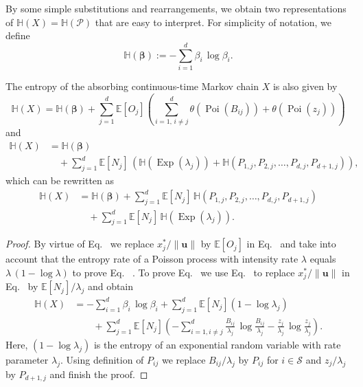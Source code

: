 \documentclass[smallextended]{svjour3}
\makeatletter
\renewcommand*{\eqref}[1]{%
  \hyperref[{#1}]{\textup{\tagform@{\ref*{#1}}}}%
}
\renewcommand{\vec}[1]{\mathbf{#1}}
\newcommand{\E}{\mathbb{E}}
\renewcommand{\H}{\mathbb{H}}
\newcommand{\Exp}{\operatorname{Exp}}
\newcommand{\Poi}{\operatorname{Poi}}
\newcommand{\suml}{\sum\limits}
\newcommand{\vnorms}[1]{\|#1\|}
\makeatother
\begin{document}
By some simple substitutions and rearrangements, we obtain two representations of $\H(X)=\H(\mathcal{P})$ that are easy to interpret.
For simplicity of notation, we define
\begin{equation}
  \H(\vec{\beta}) := -\suml_{i=1}^d\beta_i\,\log\beta_i.
\end{equation}

\begin{myproposition}\label{prop:entropy_of_X}
	The entropy of the absorbing continuous-time Markov chain $X$ is also given by
	\begin{equation}
	  \label{eqn:H_occupation_time}
	  \H(X) = \H(\vec{\beta}) + \suml_{j=1}^d \E\left[O_j\right] \left(\suml_{i=1,\,i\neq j}^d \theta(\Poi(B_{ij})) + \theta(\Poi(z_j))\right)
	\end{equation}
	and
	\begin{equation}
	  \label{eqn:H_number_of_visits}
	  \begin{aligned}
      \H(X)& = \H(\vec{\beta})\\
      &\quad + \suml_{j=1}^d \E\left[N_j\right]\, \left(\H(\Exp(\lambda_j)) + \H(P_{1,j}, P_{2, j},\ldots,P_{d, j}, P_{d+1,j})\right),
    \end{aligned}
  \end{equation}
  which can be rewritten as
  \begin{align}
    \H(X) & = \H(\vec{\beta}) + \suml_{j=1}^d \E\left[N_j\right]\, \H(P_{1,j}, P_{2, j},\ldots,P_{d, j}, P_{d+1,j}) \label{eqn:H_discrete} \\
    &\quad + \suml_{j=1}^d \E\left[N_j\right]\, \H(\Exp(\lambda_j)).\label{eqn:H_continuous}      
  \end{align}
\end{myproposition}

\begin{proof}
  By virtue of Eq.~\eqref{eqn:H_occupation_time} we replace $x^\ast_j/\vnorms{\vec{u}}$ by $\E\left[O_j\right]$ in Eq.~\eqref{eqn:H_X} and take into account that the entropy rate of a Poisson process with intensity rate $\lambda$ equals $\lambda\,(1-\log \lambda)$ to prove Eq.~\eqref{eqn:H_occupation_time}.
  To prove Eq.~\eqref{eqn:H_number_of_visits} we use Eq.~\eqref{eqn:N_i} to replace $x^\ast_j/\vnorms{\vec{u}}$ in Eq.~\eqref{eqn:H_X} by $\E\left[N_j\right]/\lambda_j$ and obtain
  \begin{equation}
    \begin{aligned}
      \H(X) &= -\suml_{i=1}^d\beta_i\,\log\beta_i + \suml_{j=1}^d \E\left[N_j\right](1-\log \lambda_j)\\
      &\qquad +\suml_{j=1}^d \E\left[N_j\right]\left(- \suml_{i=1,i\neq j}^d \frac{B_{ij}}{\lambda_j}\,\log \frac{B_{ij}}{\lambda_j} - \frac{z_j}{\lambda_j}\,\log \frac{z_j}{\lambda_j}\right).
    \end{aligned}
	\end{equation}
	Here, $(1-\log \lambda_j)$ is the entropy of an exponential random variable with rate parameter $\lambda_j$.
	Using definition \eqref{eqn:P_ij} of $P_{ij}$ we replace $B_{ij}/\lambda_j$ by $P_{ij}$ for $i\in\mathcal{S}$ and $z_j/\lambda_j$ by $P_{d+1,j}$ and finish the proof.
\end{proof}
\end{document}
